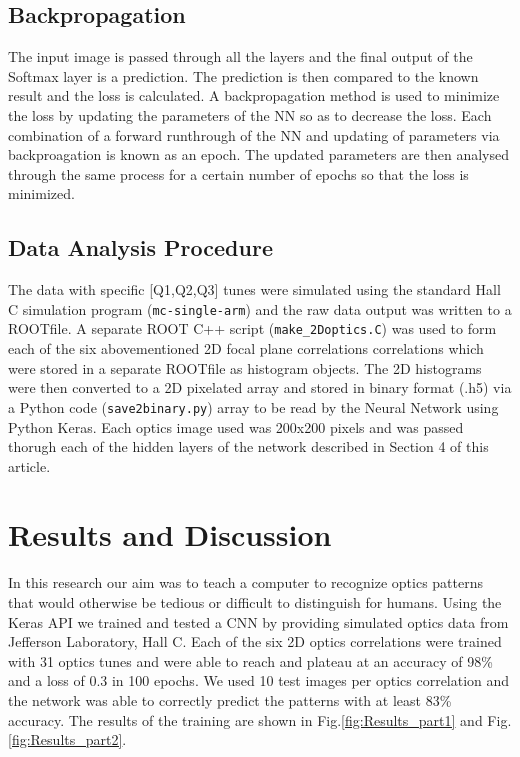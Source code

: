 \documentclass[conference]{IEEEtran}
\begin{document}
\subsection{Backpropagation}

The input image is passed through all the layers and the final output of the Softmax layer is a prediction. The prediction is then compared to the known result and the loss is calculated. A backpropagation method is used to minimize the loss by updating the parameters of the NN so as to decrease the loss. Each combination of a forward runthrough of  the NN and updating of parameters via backproagation is known as an epoch. The updated parameters are then analysed through the same process for a certain number of epochs so that the loss is minimized.

\subsection{Data Analysis Procedure}
The data with specific [Q1,Q2,Q3] tunes were simulated using the standard Hall C simulation program (\texttt{mc-single-arm})
and the raw data output was written to a ROOTfile. A separate ROOT C++ script (\texttt{make\_2Doptics.C}) was used to form each of
the six abovementioned 2D focal plane correlations correlations which were stored in a separate ROOTfile as histogram objects.
The 2D histograms were then converted to a 2D pixelated array and stored in binary format (.h5) via a Python code (\texttt{save2binary.py})
array to be read by the Neural Network using Python Keras. Each optics image used was 200x200 pixels and was passed thorugh each of
the hidden layers of the network described in Section 4 of this article.


\section{Results and Discussion}

\indent In this research our aim was to teach a computer to recognize optics patterns that would otherwise be tedious or difficult to distinguish for humans. Using the Keras API we trained and tested a CNN by providing simulated optics data from Jefferson Laboratory, Hall C. Each of the six 2D optics correlations were trained with 31 optics tunes and were able to reach and plateau at an accuracy of 98\% and a loss of 0.3 in 100 epochs. We used 10 test images per optics correlation and the network was able to correctly predict the patterns with at least 83\% accuracy. The results of the training are shown in Fig.\ref{fig:Results_part1} and Fig.\ref{fig:Results_part2}. 
\end{document}
